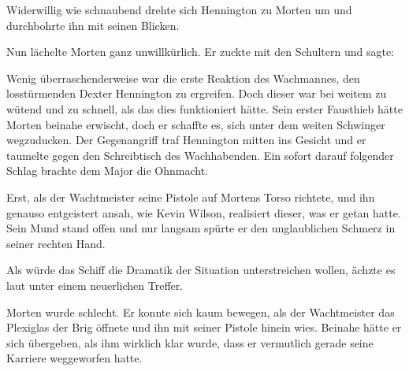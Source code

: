 \par

Widerwillig wie schnaubend drehte sich Hennington zu Morten um und durchbohrte ihn mit seinen Blicken. 

\par

Nun lächelte Morten ganz unwillkürlich. Er zuckte mit den Schultern und sagte: 

\par

Wenig überraschenderweise war die erste Reaktion des Wachmannes, den losstürmenden Dexter Hennington zu ergreifen. Doch dieser war bei weitem zu wütend und zu schnell, als das dies funktioniert hätte. Sein erster Fausthieb hätte Morten beinahe erwischt, doch er schaffte es, sich unter dem weiten Schwinger wegzuducken. Der Gegenangriff traf Hennington mitten ins Gesicht und er taumelte gegen den Schreibtisch des Wachhabenden. Ein sofort darauf folgender Schlag brachte dem Major die Ohnmacht.

\par

Erst, als der Wachtmeister seine Pistole auf Mortens Torso richtete, und ihn genauso entgeistert ansah, wie Kevin Wilson, realisiert dieser, was er getan hatte. Sein Mund stand offen und nur langsam spürte er den unglaublichen Schmerz in seiner rechten Hand.

\par

 Als würde das Schiff die Dramatik der Situation unterstreichen wollen, ächzte es laut unter einem neuerlichen Treffer. 

\par

Morten wurde schlecht. Er konnte sich kaum bewegen, als der Wachtmeister das Plexiglas der Brig öffnete und ihn mit  seiner Pistole hinein wies. Beinahe hätte er sich übergeben, als ihm wirklich klar wurde, dass er vermutlich gerade seine Karriere weggeworfen hatte.

